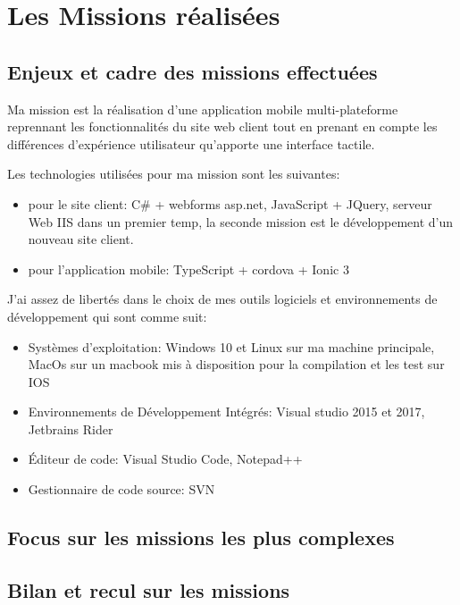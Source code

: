 \chapter{Les Missions réalisées}
\section{Enjeux et cadre des missions effectuées}
Ma mission est la réalisation d'une application mobile multi-plateforme 
reprennant les fonctionnalités du site web client tout en prenant en compte 
les différences d'expérience utilisateur qu'apporte une interface tactile.\newline

Les technologies utilisées pour ma mission sont les suivantes:
\begin{itemize}
    \item pour le site client: C\# + webforms asp.net, JavaScript + JQuery, serveur Web IIS 
    dans un premier temp, la seconde mission est le développement d'un nouveau site client.
	\item pour l'application mobile: TypeScript + cordova + Ionic 3 \newline
\end{itemize} 

J'ai assez de libertés dans le choix de mes outils logiciels et 
environnements de développement qui sont comme suit:

\begin{itemize}
	\item Systèmes d'exploitation: Windows 10 et Linux sur ma machine principale, 
	MacOs sur un macbook mis à disposition pour la compilation et les test sur IOS
	\item Environnements de Développement Intégrés: Visual studio 2015 et 2017, Jetbrains Rider 
	\item Éditeur de code: Visual Studio Code, Notepad++ 
	\item Gestionnaire de code source: SVN  \newline
\end{itemize}

\section{Focus sur les missions les plus complexes}


\section{Bilan et recul sur les missions}